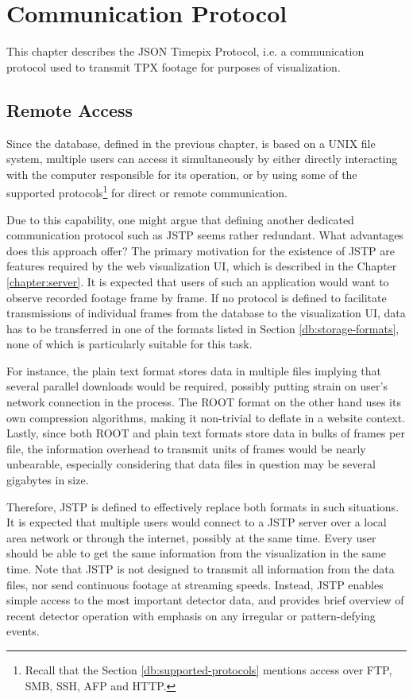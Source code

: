 \chapter{Communication Protocol}
\label{protocol:introduction}
This chapter describes the JSON Timepix Protocol, i.e. a communication protocol used to transmit TPX footage for purposes of visualization.

\section{Remote Access}
Since the database, defined in the previous chapter, is based on a UNIX file system, multiple users can access it simultaneously by either directly interacting with the computer responsible for its operation, or by using some of the supported protocols\footnote{Recall that the Section \ref{db:supported-protocols} mentions access over FTP, SMB, SSH, AFP and HTTP.} for direct or remote communication.

Due to this capability, one might argue that defining another dedicated communication protocol such as JSTP seems rather redundant. What advantages does this approach offer? The primary motivation for the existence of JSTP are features required by the web visualization UI, which is described in the Chapter \ref{chapter:server}. It is expected that users of such an application would want to observe recorded footage frame by frame. If no protocol is defined to facilitate transmissions of individual frames from the database to the visualization UI, data has to be transferred in one of the formats listed in Section \ref{db:storage-formats}, none of which is particularly suitable for this task.

For instance, the plain text format stores data in multiple files implying that several parallel downloads would be required, possibly putting strain on user's network connection in the process. The ROOT format on the other hand uses its own compression algorithms, making it non-trivial to deflate in a website context. Lastly, since both ROOT and plain text formats store data in bulks of frames per file, the information overhead to transmit units of frames would be nearly unbearable, especially considering that data files in question may be several gigabytes in size.

Therefore, JSTP is defined to effectively replace both formats in such situations. It is expected that multiple users would connect to a JSTP server over a local area network or through the internet, possibly at the same time. Every user should be able to get the same information from the visualization in the same time. Note that JSTP is not designed to transmit all information from the data files, nor send continuous footage at streaming speeds. Instead, JSTP enables simple access to the most important detector data, and provides brief overview of recent detector operation with emphasis on any irregular or pattern-defying events.

